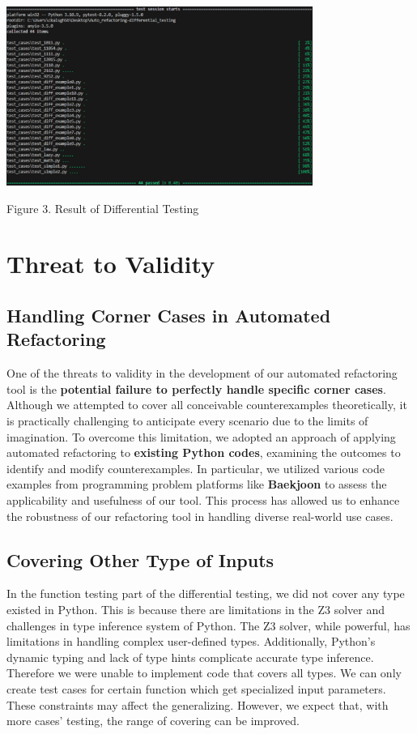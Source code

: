 \documentclass[11pt]{article}
\begin{document}
\begin{center}
\includegraphics[width = 10cm]{images/diff_result.png}

{Figure 3. Result of Differential Testing}
\end{center}

\section{Threat to Validity}
\subsection{Handling Corner Cases in Automated Refactoring}
One of the threats to validity in the development of our automated refactoring tool is the \textbf{potential failure to perfectly handle specific corner cases}. Although we attempted to cover all conceivable counterexamples theoretically, it is practically challenging to anticipate every scenario due to the limits of imagination. To overcome this limitation, we adopted an approach of applying automated refactoring to \textbf{existing Python codes}, examining the outcomes to identify and modify counterexamples. In particular, we utilized various code examples from programming problem platforms like \textbf{Baekjoon} to assess the applicability and usefulness of our tool. This process has allowed us to enhance the robustness of our refactoring tool in handling diverse real-world use cases.

\subsection{Covering Other Type of Inputs}
In the function testing part of the differential testing, we did not cover any type existed in Python. This is because there are limitations in the Z3 solver and challenges in type inference system of Python. The Z3 solver, while powerful, has limitations in handling complex user-defined types. Additionally, Python's dynamic typing and lack of type hints complicate accurate type inference. Therefore we were unable to implement code that covers all types. We can only create test cases for certain function which get specialized input parameters. These constraints may affect the generalizing. However, we expect that, with more cases' testing, the range of covering can be improved.\\
\end{document}
